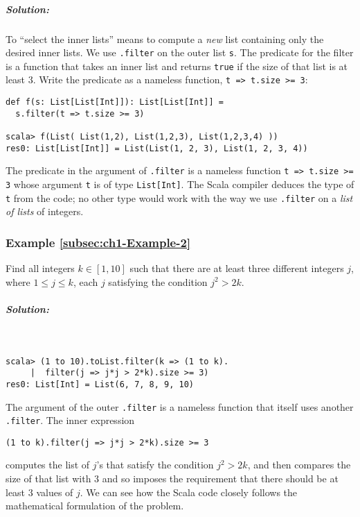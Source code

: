 \subparagraph{Solution:}

To ``select the inner lists'' means to compute a \emph{new} list
containing only the desired inner lists. We use \texttt{}\lstinline!.filter!
on the outer list \lstinline!s!.
The predicate for the filter is a function that takes an inner list
and returns \texttt{}\lstinline!true!
if the size of that list is at least $3$. Write the predicate as
a nameless function, \lstinline!t => t.size >= 3!:
\begin{lstlisting}
def f(s: List[List[Int]]): List[List[Int]] =
  s.filter(t => t.size >= 3)

scala> f(List( List(1,2), List(1,2,3), List(1,2,3,4) ))
res0: List[List[Int]] = List(List(1, 2, 3), List(1, 2, 3, 4)) 
\end{lstlisting}
The predicate in the argument of \texttt{}\lstinline!.filter!
is a nameless function \texttt{}\lstinline!t => t.size >= 3!
whose argument \texttt{}\lstinline!t!
is of type \lstinline!List[Int]!.
The Scala compiler deduces the type of \lstinline!t!
from the code; no other type would work with the way we use \lstinline!.filter!
on a \emph{list of lists} of integers.

\subsubsection{Example \label{subsec:ch1-Example-2}\ref{subsec:ch1-Example-2}}

Find all integers $k\in\left[1,10\right]$ such that there are at
least three different integers $j$, where $1\leq j\leq k$, each
$j$ satisfying the condition $j^{2}>2k$.

\subparagraph{Solution:}

~

\begin{lstlisting}
scala> (1 to 10).toList.filter(k => (1 to k).
     |  filter(j => j*j > 2*k).size >= 3)
res0: List[Int] = List(6, 7, 8, 9, 10) 
\end{lstlisting}
The argument of the outer \lstinline!.filter!
is a nameless function that itself uses another \lstinline!.filter!.
The inner expression
\begin{lstlisting}
(1 to k).filter(j => j*j > 2*k).size >= 3
\end{lstlisting}
computes the list of $j$'s that satisfy the condition $j^{2}>2k$,
and then compares the size of that list with $3$ and so imposes the
requirement that there should be at least $3$ values of $j$. We
can see how the Scala code closely follows the mathematical formulation
of the problem.

